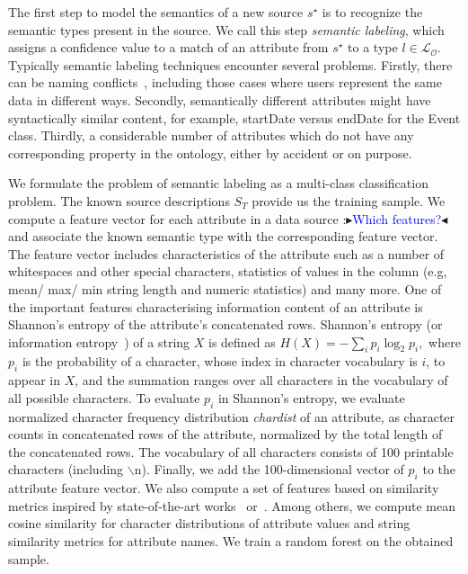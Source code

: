 \documentclass[letterpaper]{article} %
\newcommand{\authornote}[3]{
  {\fbox{\sc 
  #1}:$\blacktriangleright$\textcolor{#2}{\small{#3}}$\blacktriangleleft$}%
}
\newcommand{\ddg}[1]{\authornote{DDG}{blue}{#1}}
\begin{document}
The first step to model the semantics of a new source $s^\star$ is to recognize the semantic types present in the source. 
We call this step \emph{semantic labeling}, which assigns a confidence value to a match of an attribute from $s^\star$ to a type $l \in 
\mathcal{L_O}$.
Typically semantic labeling techniques encounter several problems.
Firstly, there can be naming conflicts~\cite{Pinkel:rodi}, including those cases where users represent the same data in different ways.
Secondly, semantically different attributes might have syntactically similar content, for example, startDate versus endDate for the Event class.
Thirdly, a considerable number of attributes which do not have any corresponding property in the ontology, either by accident or on purpose.

We formulate the problem of semantic labeling as a multi-class classification
problem.
The known source descriptions $S_T$ provide us the training sample.
We compute a feature vector for each attribute in a data source \ddg{Which features?} and associate the known semantic type with the corresponding feature vector.
The feature vector includes characteristics of the attribute such as a number of whitespaces and other special characters, statistics of values in the column (e.g, mean/ max/ min string length and numeric statistics) and many more.
One of the important features characterising information content of an attribute is Shannon's entropy of the attribute's concatenated rows.
Shannon's entropy (or information entropy~\cite{Manning:Introduction}) of a string $X$ is defined as
$H(X) = -\sum_{i}{p_i \log_{2}p_i},$ where $p_i$ is the probability of a character, whose index in character vocabulary is $i$, to appear in $X$, and the summation ranges over all
characters in the vocabulary of all possible characters.
To evaluate $p_i$ in Shannon's entropy, we evaluate normalized character frequency distribution \emph{chardist} of an attribute, as character counts in concatenated rows of the attribute, normalized by the total length of the concatenated rows.
The vocabulary of all characters consists of 100 printable characters (including $\backslash$n).
Finally, we add the 100-dimensional vector of $p_i$ to the attribute feature vector.
We also compute a set of features based on similarity metrics inspired by state-of-the-art works~\cite{Pham:semantic} or~\cite{Ritze:matching}.
Among others, we compute mean cosine similarity for character distributions of attribute values and string similarity metrics for attribute names.
We train a random forest on the obtained sample. 
\end{document}
